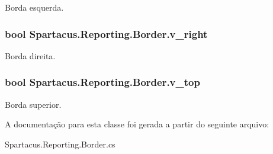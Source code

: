 Borda esquerda. 

\hypertarget{classSpartacus_1_1Reporting_1_1Border_ad2c65d6b715cda9b0f0f0d49eff456e5}{
\subsubsection[{v\+\_\+right}]{\setlength{\rightskip}{0pt plus 5cm}bool Spartacus.\+Reporting.\+Border.\+v\+\_\+right}}\label{classSpartacus_1_1Reporting_1_1Border_ad2c65d6b715cda9b0f0f0d49eff456e5}


Borda direita. 

\hypertarget{classSpartacus_1_1Reporting_1_1Border_a66c047b2bb5b2b5885b67a6808b1847e}{
\subsubsection[{v\+\_\+top}]{\setlength{\rightskip}{0pt plus 5cm}bool Spartacus.\+Reporting.\+Border.\+v\+\_\+top}}\label{classSpartacus_1_1Reporting_1_1Border_a66c047b2bb5b2b5885b67a6808b1847e}


Borda superior. 



A documentação para esta classe foi gerada a partir do seguinte arquivo\+:\begin{DoxyCompactItemize}
\item 
Spartacus.\+Reporting.\+Border.\+cs\end{DoxyCompactItemize}
